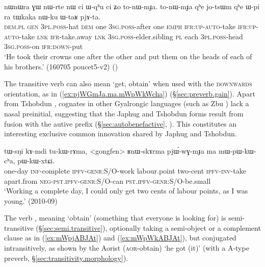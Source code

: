 \begin{exe}
\ex \label{ex:tonWmJa}
\gll  nɯnɯra ɣɯ nɯ-rte nɯ ci ɯ-qʰu ci ʑo to-nɯ-mɟa. to-nɯ-mɟa qʰe jo-tsɯm qʰe ɯ-pi ra tɯkaka nɯ-ku ɯ-taʁ pjɤ-ta. \\
\textsc{dem}.\textsc{pl} \textsc{gen} \textsc{3pl}.\textsc{poss}-hat \textsc{dem} one \textsc{3sg}.\textsc{poss}-after one \textsc{emph} \textsc{ifr}:\textsc{up}-\textsc{auto}-take  \textsc{ifr}:\textsc{up}-\textsc{auto}-take \textsc{lnk} \textsc{ifr}-take.away \textsc{lnk} \textsc{3sg}.\textsc{poss}-elder.sibling \textsc{pl} each \textsc{3pl}.\textsc{poss}-head \textsc{3sg}.\textsc{poss}-on \textsc{ifr}:\textsc{down}-put \\
\glt `He took their crowns one after the other and put them on the heads of each of his brothers.' (160705 poucet5-v2) 
()
\end{exe}

The transitive verb  can also mean `get, obtain' when used with the \textsc{downwards} orientation, as in (\ref{ex:pjWGmJa.ma.mWpWkWcha}) (§\ref{sec:preverb.gain}). Apart from Tshobdun , cognates in other Gyalrongic languages (such as Zbu ) lack a nasal preinitial, suggesting that the Japhug and Tshobdun forms result from fusion with the autive prefix (§\ref{sec:autobenefactive}, \citealt[310]{gong18these}). This constitutes an interesting exclusive common innovation shared by Japhug and Tshobdun. 

\begin{exe}
\ex \label{ex:pjWGmJa.ma.mWpWkWcha}
\gll tɯ-sŋi kɤ-mdi tu-kɯ-rɤma, <gongfen> ʁnɯ-skɤrma pjɯ́-wɣ-mɟa ma mɯ-pɯ-kɯ-cʰa, pɯ-kɯ-xtɕi.  \\
one-day \textsc{inf}-complete \textsc{ipfv}-\textsc{genr}:S/O-work labour.point two-cent \textsc{ipfv}-\textsc{inv}-take apart.from \textsc{neg}-\textsc{pst}.\textsc{ipfv}-\textsc{genr}:S/O-can \textsc{pst}.\textsc{ipfv}-\textsc{genr}:S/O-be.small \\
\glt `Working a complete day, I could only get two cents of labour points, as I was young.' (2010-09)
\end{exe}

The verb , meaning `obtain' (something that everyone is looking for) is semi-transitive (§\ref{sec:semi.transitive}), optionally taking a semi-object or a complement clause as in (\ref{ex:mWpjABJAt}) and (\ref{ex:mWpWkABJAt}), but conjugated intransitively, as shown by the Aorist  (\textsc{aor}-obtain) `he got (it)' (with a A-type preverb, §\ref{sec:transitivity.morphology}).

